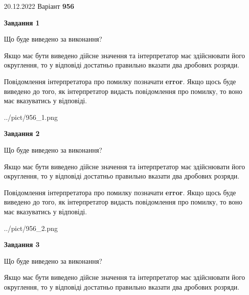 \documentclass[12pt, ukrainian]{article}
\begin{document}
{20.12.2022 Варіант \No \textbf { 956 }\par}
{
\begin {Large}

{\begin {center}\textbf{Завдання 1}\end {center}}\par
Що буде виведено за виконання? \par

Якщо має бути виведено дійсне значення та інтерпретатор має здійснювати його округлення, 
то у відповіді достатньо правильно вказати два дробових розряди.

Повідомлення інтерпретатора про помилку позначати \textbf{error}.
Якщо щось буде виведено до того, як інтерпретатор видасть повідомлення про помилку, 
то воно має вказуватись у відповіді. \par

\begin{center}
	{../pict/956_1.png}
\end{center}
\newpage

{\begin {center}\textbf{Завдання 2}\end {center}}\par
Що буде виведено за виконання? \par

Якщо має бути виведено дійсне значення та інтерпретатор має здійснювати його округлення, 
то у відповіді достатньо правильно вказати два дробових розряди.

Повідомлення інтерпретатора про помилку позначати \textbf{error}.
Якщо щось буде виведено до того, як інтерпретатор видасть повідомлення про помилку, 
то воно має вказуватись у відповіді. \par

\begin{center}
	{../pict/956_2.png}
\end{center}
\newpage

{\begin {center}\textbf{Завдання 3}\end {center}}\par
Що буде виведено за виконання? \par

Якщо має бути виведено дійсне значення та інтерпретатор має здійснювати його округлення, 
то у відповіді достатньо правильно вказати два дробових розряди.


\end{Large}}
\end{document}
